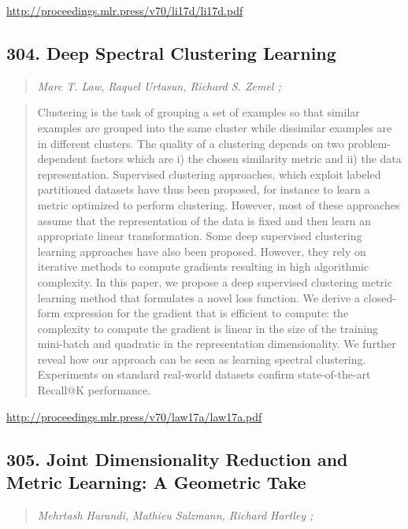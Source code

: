 \documentclass{article}
\begin{document}
\href{http://proceedings.mlr.press/v70/li17d/li17d.pdf}{http://proceedings.mlr.press/v70/li17d/li17d.pdf}

\subsection{304. Deep Spectral Clustering Learning}

\begin{quote}
\footnotesize{\textit{Marc T. Law, Raquel Urtasun, Richard S. Zemel ;}}

\end{quote}

\begin{quote}
    Clustering is the task of grouping a set of examples so that similar examples are grouped into the same cluster while dissimilar examples are in different clusters. The quality of a clustering depends on two problem-dependent factors which are i) the chosen similarity metric and ii) the data representation. Supervised clustering approaches, which exploit labeled partitioned datasets have thus been proposed, for instance to learn a metric optimized to perform clustering. However, most of these approaches assume that the representation of the data is fixed and then learn an appropriate linear transformation. Some deep supervised clustering learning approaches have also been proposed. However, they rely on iterative methods to compute gradients resulting in high algorithmic complexity. In this paper, we propose a deep supervised clustering metric learning method that formulates a novel loss function. We derive a closed-form expression for the gradient that is efficient to compute: the complexity to compute the gradient is linear in the size of the training mini-batch and quadratic in the representation dimensionality. We further reveal how our approach can be seen as learning spectral clustering. Experiments on standard real-world datasets confirm state-of-the-art Recall@K performance.  
\end{quote}

\href{http://proceedings.mlr.press/v70/law17a/law17a.pdf}{http://proceedings.mlr.press/v70/law17a/law17a.pdf}

\subsection{305. Joint Dimensionality Reduction and Metric Learning: A Geometric Take}

\begin{quote}
\footnotesize{\textit{Mehrtash Harandi, Mathieu Salzmann, Richard Hartley ;}}

\end{quote}
\end{document}
